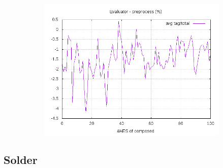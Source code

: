\documentclass[10pt,a4paper]{article}
\begin{document}
\begin{figure}[h]
\begin{subfigure}[t]{0.3\textwidth}
        \includegraphics[width=\textwidth]{eval_preprocess_frac}
        \caption{}
    \end{subfigure}
\end{figure}


\subsection{Solder}
\end{document}
